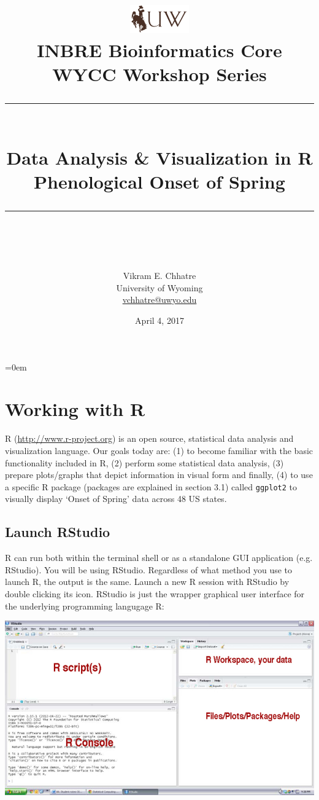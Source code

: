 \documentclass[11pt,twosided]{article}
\title{\includegraphics[width=1in]{uwlogo}\\
\vspace{1in}  
{\huge INBRE Bioinformatics Core \\\vspace{5pt} {\LARGE WYCC Workshop Series}} \\
\begin{center}
\rule{6in}{0.4pt}\\\vspace{0.2in}
{\huge Data Analysis \& Visualization in R \\\vspace{0.15in} {\LARGE Phenological Onset of Spring}}\\
\vspace{0.15in}
\rule{6in}{0.4pt}\\
\end{center}
\vspace{1in}
}
\author{{\LARGE Vikram E. Chhatre \\ University of Wyoming} \\
\vspace{2ex}
{\large \href{mailto:vchhatre@uwyo.edu}{vchhatre@uwyo.edu} \\
}}
\date{April 4, 2017}
\begin{document}
\pagestyle{fancy}
\maketitle

\thispagestyle{empty}

\clearpage
\tableofcontents
\clearpage
\parindent=0em


\section{Working with R}
R (\url{http://www.r-project.org}) is an open source, statistical data analysis and visualization language. Our goals today are: (1) to become familiar with the basic functionality included in R, (2) perform some statistical data analysis, (3) prepare plots/graphs that depict information in visual form and finally, (4) to use a specific R package (packages are explained in section 3.1) called {\tt ggplot2} to visually display `Onset of Spring' data across 48 US states.\\

\subsection{Launch RStudio}
R can run both within the terminal shell or as a standalone GUI application (e.g. RStudio).  You will be using RStudio.  Regardless of what method you use to launch R, the output is the same.  Launch a new R session with RStudio by double clicking its icon.  RStudio is just the wrapper graphical user interface for the underlying programming langugage R:\\

%
%

\begin{center}
\includegraphics[width=7in]{rstudio}
\end{center}
\end{document}
